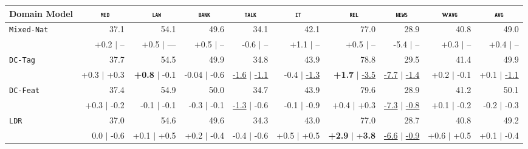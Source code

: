 \documentclass[12pt,a4paper,twoside]{report}
\theoremstyle{definition}
\newcommand{\domain}[1]{\texttt{\textsc{#1}}}
\newcommand{\system}[1]{\texttt{{#1}}}
\newcommand{\SB}[1]{\textbf{#1}}
\newcommand{\SW}[1]{\underline{#1}}
\newcommand{\sbcl}[2]{{\scriptsize #1 \hfill $|$ \hfill  #2}}
\begin{document}
\begin{table*}[h!]
  \centering
  \begin{tabular}{|p{1.6cm}|*{9}{r|}} \hline
    \footnotesize
   \hfill Domain  Model \hfill & \multicolumn{1}{c|}{\domain{ med}} & \multicolumn{1}{c|}{\domain{ law}} & \multicolumn{1}{c|}{\domain{bank}} & \multicolumn{1}{c|}{\domain{talk}} & \multicolumn{1}{c|}{\domain{ it }} & \multicolumn{1}{c|}{\domain{ rel}} & \multicolumn{1}{c|}{\domain{news}} & \multicolumn{1}{c|}{w\domain{avg}} & \multicolumn{1}{c|}{\domain{avg}} \\ \hline 
    \footnotesize\system{Mixed-Nat}  & 37.1  & 54.1  & 49.6	& 34.1  & 42.1	& 77.0 & 28.9 & 40.8	& 49.0 \\[-2pt]
                   & \sbcl{+0.2}{--}  &\sbcl{+0.5}{---} &\sbcl{+0.5}{--} &\sbcl{-0.6}{--} &\sbcl{+1.1}{--} &\sbcl{+0.5}{--} &\sbcl{-5.4}{--} &\sbcl{+0.3}{--} & \sbcl{+0.4}{--} \\
    \hline%
    \footnotesize \system{DC-Tag}      &  37.7 & 54.5   & 49.9    &  34.8 &  43.9  & 78.8 & 29.5  & 41.4 & 49.9\\[-2pt]
                   & \sbcl{+0.3}{+0.3}  & \sbcl{\SB{+0.8}}{-0.1}   & \sbcl{-0.04}{-0.6}  & \sbcl{\SW{-1.6}}{\SW{-1.1}}  &  \sbcl{-0.4}{\SW{-1.3}}  & \sbcl{\SB{+1.7}}{\SW{-3.5}}  & \sbcl{\SW{-7.7}}{\SW{-1.4}}  & \sbcl{+0.2}{-0.1} & \sbcl{+0.1}{\SW{-1.1}}\\
                   
    \footnotesize \system{DC-Feat}     & 37.4 & 54.9   & 50.0    & 34.7  &  43.9  & 79.6 & 28.9  & 41.2 & 50.1\\[-2pt]
                   &  \sbcl{+0.3}{-0.2} & \sbcl{-0.1}{-0.1}  & \sbcl{-0.3}{-0.1} & \sbcl{\SW{-1.3}}{-0.6} & \sbcl{-0.1}{-0.9} & \scriptsize \sbcl{+0.4}{+0.3} & \sbcl{\SW{-7.3}}{\SW{-0.8}} & \sbcl{+0.1}{-0.2} & \sbcl{-0.2}{-0.3}\\
    
    \footnotesize \system{LDR}    & 37.0   & 54.6  & 49.6    & 34.3  &  43.0  &77.0  & 28.7 & 40.8 & 49.2 \\[-2pt]
                    & \sbcl{0.0}{-0.6} &  \sbcl{+0.1}{+0.5} & \sbcl{+0.2}{-0.4} &  \sbcl{-0.4}{-0.6} &  \sbcl{+0.5}{+0.5} & \sbcl{\SB{+2.9}}{+\SB{3.8}} & \sbcl{\SW{-6.6}}{\SW{-0.9}} & \sbcl{+0.6}{+0.5} &  \sbcl{+0.1}{-0.4} \\


\end{tabular}
\end{table*}
\end{document}
